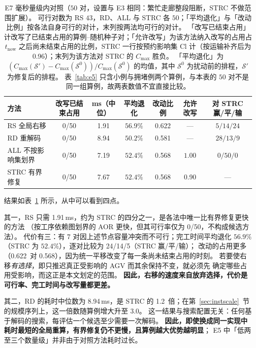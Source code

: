 \documentclass[manuscript,screen,review]{acmart}
\providecommand{\STRC}{\textsc{STRC}}
\newcommand{\NPairs}{50}
\newcommand{\FeasRone}{0/\NPairs}            %
\newcommand{\ClosureAliveFrac}{90\%}
\newcommand{\MsShift}{1.91}          %
\newcommand{\MsRedecode}{8.94}       %
\newcommand{\MsAllFuture}{7.19}      %
\newcommand{\MsCheapRtwo}{7.67}      %
\newcommand{\RedecodeRatio}{1.2}     %
\newcommand{\ShiftBad}{0/\NPairs}    %
\newcommand{\RedecodeBad}{0/\NPairs}
\newcommand{\WinVsShift}{24/14/5}  %
\newcommand{\ResFracCheapRtwo}{0.568}
\newcommand{\ResFracShift}{0.622}
\newcommand{\ResFracRedecode}{0.581}
\newcommand{\ResFracAllFuture}{0.568}
\newcommand{\ClosureShareMean}{0.90} %
\newcommand{\ScaleRatioHi}{3.0}  %
\newcommand{\SegShare}{0.96}             %
\begin{document}
\begin{table}[t]
\centering
\caption{E7 毫秒量级内对照（\(\NPairs\) 对，设置与 E3 相同：繁忙走廊整段阻断，\STRC{} 不做范围扩展）。
可行对数为 RS \(43\)，RD、ALL 与 \STRC{} 各 \(\NPairs\)；「平均退化」与「改动比例」按各法自身可行的对计，末列按两法均可行的对计。
「改写已结束占用」计改写了已结束占用的算例--随机种子对；「允许改写」为该方法纳入改写的占用占 \(t_{\mathrm{now}}\)
之后尚未结束占用的比例，\STRC{} 一行按预约影响集 \(\mathrm{Cl}\) 计（按运输补齐后为 \SegShare）；末列为该方法对 \STRC{} 的 \(C_{\max}\) 胜负。
「平均退化」为 \((C_{\max}(\mathcal{S}')-C_{\max}(\mathcal{S}^0))/C_{\max}(\mathcal{S}^0)\) 的均值，其中 \(\mathcal{S}^0\) 为扰动前的排程，\(\mathcal{S}'\) 为修复后的排程。
表~\ref{tab:e5} 只含小例与拥堵例两个算例，与本表的 \(\NPairs\) 对不是同一组算例，故两表数值不宜直接比较。}
\label{tab:cheap}
\small
\begin{tabular}{@{}lcccccc@{}}
\toprule
方法 & 改写已结束占用 & ms（中位）& 平均退化 & 改动比例 & 允许改写 & 对 \STRC{} 赢/平/输 \\
\midrule
RS 全局右移      & \ShiftBad     & \MsShift    & \(56.9\%\) & \ResFracShift    & ---   & \(5/14/24\) \\
RD 重解码        & \RedecodeBad  & \MsRedecode & \(50.2\%\) & \ResFracRedecode & ---   & \(28/13/9\) \\
ALL 不按影响集划界 & \ShiftBad     & \MsAllFuture & \(52.4\%\) & \ResFracAllFuture & \(1.00\) & \(0/50/0\) \\
\STRC{} 有界修复      & \ShiftBad     & \MsCheapRtwo & \(52.4\%\) & \ResFracCheapRtwo & \ClosureShareMean & --- \\
\bottomrule
\end{tabular}
\end{table}

结果如表~\ref{tab:cheap} 所示，从中可以看到四点。

其一，RS 只需 \MsShift\,ms，约为 \STRC{} 的四分之一，是各法中唯一比有界修复更快的方法
（按工序依赖图划界的 AOR 更快，但其可行率仅为 \FeasRone，不构成候选方法）。
代价有三：有 \(7\) 对因上述节点容量冲突而不可行；完工时间平均退化 \(56.9\%\)（\STRC{} 为 \(52.4\%\)），逐对比较为 \WinVsShift（\STRC{} 赢/平/输）；
改动的占用更多（\ResFracShift\ 对 \ResFracCheapRtwo），因为统一平移改变了每一条尚未结束占用的时刻。
若要使右移\emph{有选择}，即只推迟真正受影响的 AGV 而其余保持不变，就必须先
确定哪些占用受影响，而这正是本文划定的范围。
\textbf{因此，右移的速度来自放弃选择，代价是可行率、完工时间与改写量都更差。}

其二，RD 的耗时中位数为 \MsRedecode\,ms，是 \STRC{} 的 \RedecodeRatio\ 倍；在第~\ref{sec:instscale}~节的规模序列上，这一倍数随算例增大升至 \(\ScaleRatioHi\)。
这一结果与搜索配置无关：任何基于解码的搜索，每评估一个候选至少需要一次解码。
\textbf{因此，即使换成同一实现中耗时最短的全局重算，有界修复仍不更慢，且算例越大优势越明显}；
E5 中「低两至三个数量级」并非由于对照方法耗时过长。
\end{document}
